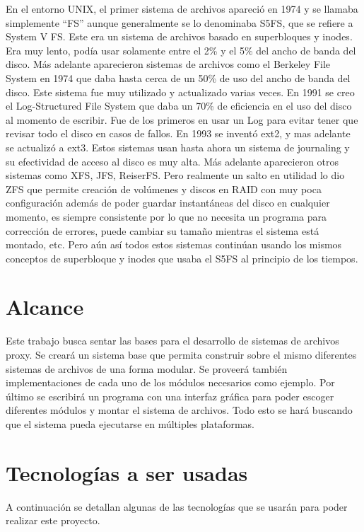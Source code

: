 En el entorno UNIX, el primer sistema de archivos apareció en 1974 y se llamaba simplemente ``FS'' aunque generalmente se lo denominaba S5FS, que se refiere a System V FS. Este era un sistema de archivos basado en superbloques y inodes. Era muy lento, podía usar solamente entre el 2\% y el 5\% del ancho de banda del disco. Más adelante aparecieron sistemas de archivos como el Berkeley File System en 1974 que daba hasta cerca de un 50\% de uso del ancho de banda del disco. Este sistema fue muy utilizado y actualizado varias veces. En 1991 se creo el Log-Structured File System que daba un 70\% de eficiencia en el uso del disco al momento de escribir. Fue de los primeros en usar un Log para evitar tener que revisar todo el disco en casos de fallos. En 1993 se inventó ext2, y mas adelante se actualizó a ext3. Estos sistemas usan hasta ahora un sistema de journaling y su efectividad de acceso al disco es muy alta. Más adelante aparecieron otros sistemas como XFS, JFS, ReiserFS. Pero realmente un salto en utilidad lo dio ZFS que permite creación de volúmenes y discos en RAID con muy poca configuración además de poder guardar instantáneas del disco en cualquier momento, es siempre consistente por lo que no necesita un programa para corrección de errores, puede cambiar su tamaño mientras el sistema está montado, etc. Pero aún así todos estos sistemas continúan usando los mismos conceptos de superbloque y inodes que usaba el S5FS al principio de los tiempos.


\section{Alcance}

Este trabajo busca sentar las bases para el desarrollo de sistemas de archivos proxy. Se creará un sistema base que permita construir sobre el mismo diferentes sistemas de archivos de una forma modular. Se proveerá también implementaciones de cada uno de los módulos necesarios como ejemplo. Por último se escribirá un programa con una interfaz gráfica para poder escoger diferentes módulos y montar el sistema de archivos. Todo esto se hará buscando que el sistema pueda ejecutarse en múltiples plataformas.


\section{Tecnologías a ser usadas}

A continuación se detallan algunas de las tecnologías que se usarán para poder realizar este proyecto.


